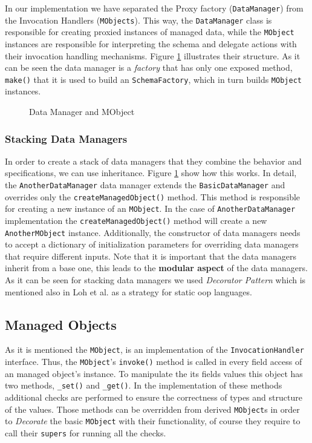 In our implementation we have separated the Proxy factory (\texttt{DataManager}) from the Invocation Handlers (\texttt{MObjects}).
This way, the \texttt{DataManager} class is responsible for creating proxied instances of managed data, while the \texttt{MObject} instances are responsible for interpreting the schema and delegate actions with their invocation handling mechanisms. 
Figure \ref{fig:DataManager_and_MObject} illustrates their structure.
As it can be seen the data manager is a \textit{factory} that has only one exposed method, \texttt{make()} that it is used to build an \texttt{SchemaFactory}, which in turn builds \texttt{MObject} instances.

\begin{figure}[H]
	\centering
  	\caption{Data Manager and MObject}
  	\label{fig:DataManager_and_MObject}
\end{figure}

\subsubsection{Stacking Data Managers}
In order to create a stack of data managers that they combine the behavior and specifications, we can use inheritance.
Figure \ref{fig:DataManager_and_MObject} show how this works.
In detail, the \texttt{AnotherDataManager} data manager extends the \texttt{BasicDataManager} and overrides only the \texttt{createManagedObject()} method. 
This method is responsible for creating a new instance of an \texttt{MObject}.
In the case of \texttt{AnotherDataManager} implementation the \texttt{createManagedObject()} method will create a new \texttt{AnotherMObject} instance.
Additionally, the constructor of data managers needs to accept a dictionary of initialization parameters for overriding data managers that require different inputs.
Note that it is important that the data managers inherit from a base one, this leads to the \textbf{modular aspect} of the data managers.
As it can be seen for stacking data managers we used \textit{Decorator Pattern} \cite{gamma1995design} which is mentioned also in Loh et al. \cite{loh2012managed} as a strategy for static \ac{oop} languages.

\subsection{Managed Objects}\label{sec:Managed Objects}
As it is mentioned the \texttt{MObject}, is an implementation of the \texttt{InvocationHandler} interface.
Thus, the \texttt{MObject}'s \texttt{invoke()} method is called in every field access of an managed object's instance.
To manipulate the its fields values this object has two methods, \texttt{\_set()} and \texttt{\_get()}.
In the implementation of these methods additional checks are performed to ensure the correctness of types and structure of the values.
Those methods can be overridden from derived \texttt{MObject}s in order to \textit{Decorate} the basic \texttt{MObject} with their functionality, of course they require to call their \texttt{supers} for running all the checks.

